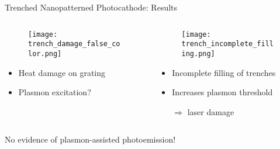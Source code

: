 \begin{frame}{Trenched Nanopatterned Photocathode: Results}
  \begin{columns}
    \begin{column}{0.49\linewidth}
      \begin{figure}
        \centering
        \texttt{[image: trench\_damage\_false\_color.png]}
      \end{figure}
      \begin{itemize}
        \item Heat damage on grating
        \item Plasmon excitation?
      \end{itemize}
    \end{column}
    \begin{column}{0.49\linewidth}
      \begin{figure}
        \centering
        \texttt{[image: trench\_incomplete\_filling.png]}
      \end{figure}
      \begin{itemize}
        \item Incomplete filling of trenches
        \item Increases plasmon threshold 
        \item[$\Rightarrow$] laser damage 
      \end{itemize}
    \end{column}
  \end{columns}
  \vfill
  \begin{center}
    \alert{No evidence of plasmon-assisted photoemission!}
  \end{center}
\end{frame}


